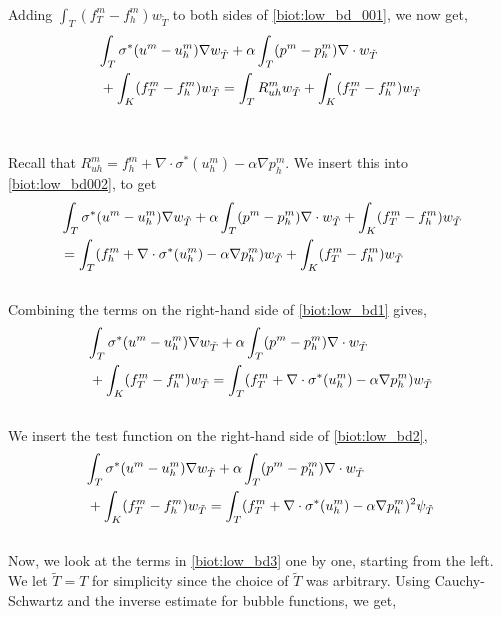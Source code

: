 \\
Adding $\int_T (f^m_T - f_h^m) w_{\tilde{T}}$ to both sides of \eqref{biot:low_bd_001}, we now get,
\begin{align} \label{biot:low_bd002}
& \int_T \sigma^*(u^m-u^m_h) \nabla w_{\tilde{T}} + \alpha \int_T (p^m-p_h^m) \nabla \cdot w_{\tilde{T}} \\
& \,+\int_K (f^m_T - f_h^m) w_{\tilde{T}} =  \int_T R^m_{uh} w_{\tilde{T}} +\int_K (f^m_T - f_h^m) w_{\tilde{T}} \notag
\end{align}
\\
\\
Recall that $R^m_{uh} = f_h^m + \nabla \cdot \sigma^{\ast}(u_h^m) - \alpha \nabla p_h^m$. We insert this into \eqref{biot:low_bd002}, to get
\begin{align} \label{biot:low_bd1}
 & \,\int_T \sigma^*(u^m-u^m_h) \nabla w_{\tilde{T}} +\alpha \int_T (p^m-p_h^m) \nabla \cdot w_{\tilde{T}} +\int_K (f^m_T - f_h^m) w_{\tilde{T}} \\
& \, = \int_T (f_h^m + \nabla \cdot \sigma^{\ast}(u_h^m) - \alpha \nabla p_h^m) w_{\tilde{T}} +\int_K (f^m_T - f_h^m) w_{\tilde{T}} \notag
\end{align}
\\
Combining the terms on the right-hand side of \eqref{biot:low_bd1} gives,
\\
\begin{align} \label{biot:low_bd2}
& \int_T \sigma^*(u^m-u^m_h) \nabla w_{\tilde{T}} + \alpha \int_T (p^m-p_h^m) \nabla \cdot w_{\tilde{T}} \\
& \, +\int_K (f^m_T - f_h^m) w_{\tilde{T}} = \int_T (f_T^m + \nabla \cdot \sigma^{\ast}(u_h^m) - \alpha \nabla p_h^m) w_{\tilde{T}}  \notag
\end{align}
\\
We insert the test function on the right-hand side of \eqref{biot:low_bd2},
\\
\begin{align} \label{biot:low_bd3}
& \int_T \sigma^*(u^m-u^m_h) \nabla w_{\tilde{T}} + \alpha \int_T (p^m-p_h^m) \nabla \cdot w_{\tilde{T}} \\
& \,+\int_K (f^m_T - f_h^m) w_{\tilde{T}} = \int_T (f_T^m + \nabla \cdot \sigma^{\ast}(u_h^m) - \alpha \nabla p_h^m)^2 \psi_{\tilde{T}} \notag
\end{align}
\\
Now, we look at the terms in \eqref{biot:low_bd3} one by one, starting from the left. We let $\tilde{T} = T$ for simplicity since the choice of $\tilde{T}$ was arbitrary. Using Cauchy-Schwartz and the inverse estimate for bubble functions, we get,
